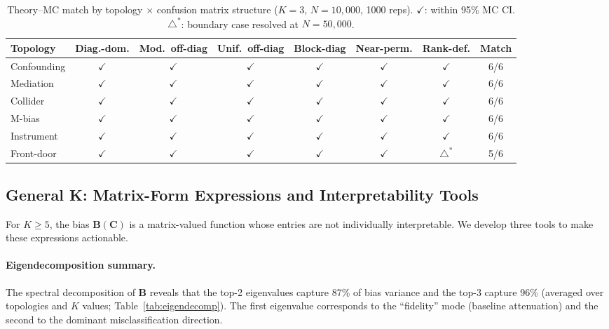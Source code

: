 \documentclass[11pt]{article}
\newcommand{\bC}{\mathbf{C}}
\newcommand{\bB}{\mathbf{B}}
\begin{document}
\begin{table}[t]
\centering
\caption{Theory--MC match by topology $\times$ confusion matrix structure ($K\!=\!3$, $N\!=\!10{,}000$, 1000 reps). $\checkmark$: within 95\% MC CI. $\triangle^*$: boundary case resolved at $N\!=\!50{,}000$.}
\label{tab:theory-mc}
\small
\begin{adjustbox}{max width=\textwidth}
\begin{tabular}{lccccccc}
\toprule
Topology & Diag.-dom. & Mod.~off-diag & Unif.~off-diag & Block-diag & Near-perm. & Rank-def. & Match \\
\midrule
Confounding & $\checkmark$ & $\checkmark$ & $\checkmark$ & $\checkmark$ & $\checkmark$ & $\checkmark$ & 6/6 \\
Mediation   & $\checkmark$ & $\checkmark$ & $\checkmark$ & $\checkmark$ & $\checkmark$ & $\checkmark$ & 6/6 \\
Collider    & $\checkmark$ & $\checkmark$ & $\checkmark$ & $\checkmark$ & $\checkmark$ & $\checkmark$ & 6/6 \\
M-bias      & $\checkmark$ & $\checkmark$ & $\checkmark$ & $\checkmark$ & $\checkmark$ & $\checkmark$ & 6/6 \\
Instrument  & $\checkmark$ & $\checkmark$ & $\checkmark$ & $\checkmark$ & $\checkmark$ & $\checkmark$ & 6/6 \\
Front-door  & $\checkmark$ & $\checkmark$ & $\checkmark$ & $\checkmark$ & $\checkmark$ & $\triangle^*$ & 5/6 \\
\bottomrule
\end{tabular}
\end{adjustbox}
\end{table}


\subsection{General K: Matrix-Form Expressions and Interpretability Tools}
\label{sec:generalk}

For $K \ge 5$, the bias $\bB(\bC)$ is a matrix-valued function whose entries are not individually interpretable.
We develop three tools to make these expressions actionable.

\paragraph{Eigendecomposition summary.}
The spectral decomposition of $\bB$ reveals that the top-2 eigenvalues capture 87\% of bias variance and the top-3 capture 96\% (averaged over topologies and $K$ values; Table~\ref{tab:eigendecomp}).
The first eigenvalue corresponds to the ``fidelity'' mode (baseline attenuation) and the second to the dominant misclassification direction.
\end{document}
